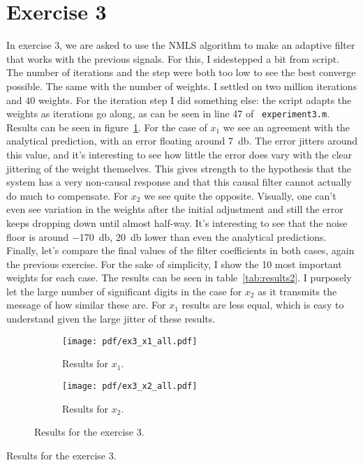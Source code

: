 \FloatBarrier
\section{Exercise 3}

In exercise 3, we are asked to use the NMLS algorithm to make an adaptive filter
that works with the previous signals. For this, I sidestepped a bit from script.
The number of iterations and the step were both too low to see the best converge
possible. The same with the number of weights. I settled on two million iterations
and \(40\) weights. For the iteration step I did something else: the script adapts
the weights as iterations go along, as can be seen in line 47 of {\tt
experiment3.m}. Results can be seen in figure~\ref{fig:ex3res}. For the case of
\(x_1\) we see an agreement with the analytical prediction, with an error floating
around \SI{7}{\decibel}. The error jitters around this value, and it's interesting
to see how little the error does vary with the clear jittering of the weight
themselves. This gives strength to the hypothesis that the system has a very
non-causal response and that this causal filter cannot actually do much to
compensate. For \(x_2\) we see quite the opposite. Visually, one can't even see
variation in the weights after the initial adjustment and still the error keeps
dropping down until almost half-way. It's interesting to see that the noise floor
is around \SI{-170}{\decibel}, \SI{20}{\decibel} lower than even the analytical
predictions. Finally, let's compare the final values of the filter coefficients in
both cases, again the previous exercise. For the sake of simplicity, I show the 10
most important weights for each case. The results can be seen in
table~\ref{tab:results2}. I purposely let the large number of significant digits
in the case for \(x_2\) as it transmits the message of how similar these are. For
\(x_1\) results are less equal, which is easy to understand given the large jitter
of these results.
\begin{figure}[h!]
    \centering
    \begin{subfigure}[t]{0.32\columnwidth}
        \centering
        \texttt{[image: pdf/ex3\_x1\_all.pdf]}
        \caption{Results for \(x_1\).}
    \end{subfigure} \hspace{1cm}
    \begin{subfigure}[t]{0.32\columnwidth}
        \centering
        \texttt{[image: pdf/ex3\_x2\_all.pdf]}
        \caption{Results for \(x_2\).}
    \end{subfigure}
    \caption{Results for the exercise 3.\label{fig:ex3res}}
\end{figure}
\begin{table}[h!]
    \centering
    \scalebox{0.65}{
        
    }
    \caption{Results for the exercise 3.\label{tab:results2}}
\end{table}

